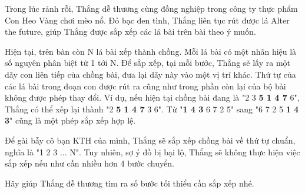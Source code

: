 Trong lúc rảnh rỗi, Thắng dễ thương cùng đồng nghiệp trong công ty thực phẩm Con Heo Vàng chơi mèo nổ. Đỏ bạc đen tình, Thắng liên tục rút được lá Alter the future, giúp Thắng được sắp xếp các lá bài trên bài theo ý muốn.

Hiện tại, trên bàn còn N lá bài xếp thành chồng. Mỗi lá bài có một nhãn hiệu là số nguyên phân biệt từ 1 tới N. Để sắp xếp, tại mỗi bước, Thắng sẽ lấy ra một dãy con liên tiếp của chồng bài, đưa lại dãy này vào một vị trí khác. Thứ tự của các lá bài trong đoạn con được rút ra cũng như trong phần còn lại của bộ bài không được phép thay đổi. Ví dụ, nếu hiện tại chồng bài đang là "2 3 \textbf{5 1 4 7} 6", Thắng có thể xếp lại thành "2 \textbf{5 1 4 7 }3 6". Từ "\textbf{1 4 3} 6 7 2 5" sang "6 7 2 5 \textbf{1 4 3}" cũng là một phép sắp xếp hợp lệ.

Để gài bẫy cô bạn KTH của mình, Thắng sẽ sắp xếp chồng bài về thứ tự chuẩn, nghĩa là "1 2 3 ... N". Tuy nhiên, sợ ý đồ bị bại lộ, Thắng sẽ không thực hiện việc sắp xếp nếu như cần nhiều hơn 4 bước chuyển.

Hãy giúp Thắng đễ thương tìm ra số bước tối thiểu cần sắp xếp nhé.